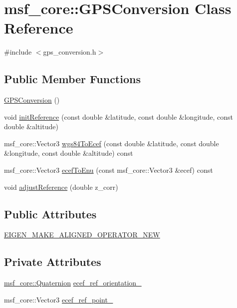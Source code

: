 \hypertarget{classmsf__core_1_1GPSConversion}{\section{msf\-\_\-core\-:\-:G\-P\-S\-Conversion Class Reference}
\label{classmsf__core_1_1GPSConversion}
}


{\ttfamily \#include $<$gps\-\_\-conversion.\-h$>$}

\subsection*{Public Member Functions}
\begin{DoxyCompactItemize}
\item 
\hyperlink{classmsf__core_1_1GPSConversion_ac849380a60706295bd7c33396ae7a239}{G\-P\-S\-Conversion} ()
\item 
void \hyperlink{classmsf__core_1_1GPSConversion_a5d4b6af72d1dbbf6f948ca39b020e6cd}{init\-Reference} (const double \&latitude, const double \&longitude, const double \&altitude)
\item 
msf\-\_\-core\-::\-Vector3 \hyperlink{classmsf__core_1_1GPSConversion_aeecd648087a584921a2372156b948b54}{wgs84\-To\-Ecef} (const double \&latitude, const double \&longitude, const double \&altitude) const 
\item 
msf\-\_\-core\-::\-Vector3 \hyperlink{classmsf__core_1_1GPSConversion_aa4a4410a1b149d99b41a6865034ba1d7}{ecef\-To\-Enu} (const msf\-\_\-core\-::\-Vector3 \&ecef) const 
\item 
void \hyperlink{classmsf__core_1_1GPSConversion_ae1c380b419236d93c266c89db9ba5a43}{adjust\-Reference} (double z\-\_\-corr)
\end{DoxyCompactItemize}
\subsection*{Public Attributes}
\begin{DoxyCompactItemize}
\item 
\hyperlink{classmsf__core_1_1GPSConversion_a5e8ca97d7f7c277ffba2dee4ebbc5092}{E\-I\-G\-E\-N\-\_\-\-M\-A\-K\-E\-\_\-\-A\-L\-I\-G\-N\-E\-D\-\_\-\-O\-P\-E\-R\-A\-T\-O\-R\-\_\-\-N\-E\-W}
\end{DoxyCompactItemize}
\subsection*{Private Attributes}
\begin{DoxyCompactItemize}
\item 
\hyperlink{namespacemsf__core_a044c525dd7800e2e2f4bb86fc565a7c7}{msf\-\_\-core\-::\-Quaternion} \hyperlink{classmsf__core_1_1GPSConversion_a0e9c31df90370cecca9b220472883c0f}{ecef\-\_\-ref\-\_\-orientation\-\_\-}
\item 
msf\-\_\-core\-::\-Vector3 \hyperlink{classmsf__core_1_1GPSConversion_a618282a287b69c4704ac6191185c6ef2}{ecef\-\_\-ref\-\_\-point\-\_\-}
\end{DoxyCompactItemize}


